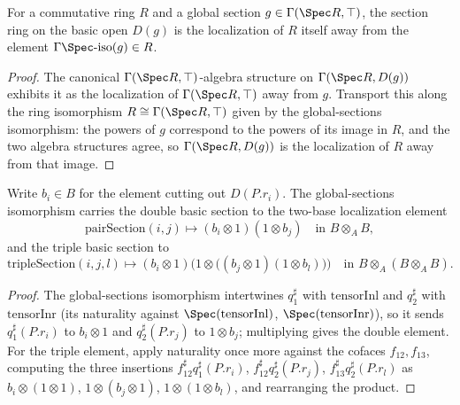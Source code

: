 \begin{theorem}
  \label{thm:isLocalization_away_sections}
  \leanok
  For a commutative ring \(R\) and a global section \(g \in \Gamma(\Spec R, \top)\), the
  section ring on the basic open \(D(g)\) is the localization of \(R\) itself away from the
  element \(\Gamma\Spec\text{-}\mathrm{iso}(g) \in R\).
\end{theorem}
\begin{proof}
  \leanok
  The canonical \(\Gamma(\Spec R, \top)\)-algebra structure on \(\Gamma(\Spec R, D(g))\)
  exhibits it as the localization of \(\Gamma(\Spec R, \top)\) away from \(g\). Transport this
  along the ring isomorphism \(R \cong \Gamma(\Spec R, \top)\) given by the global-sections
  isomorphism: the powers of \(g\) correspond to the powers of its image in \(R\), and the two
  algebra structures agree, so \(\Gamma(\Spec R, D(g))\) is the localization of \(R\) away from
  that image.
\end{proof}

\begin{lemma}
  \label{lem:GammaSpecIso_hom_pairTripleSection}
  \leanok
  Write \(b_i \in B\) for the element cutting out \(D(P.r_i)\). The global-sections
  isomorphism carries the double basic section to the two-base localization element
  \[
    \mathrm{pairSection}(i, j) \mapsto (b_i \otimes 1)(1 \otimes b_j)
    \quad\text{in } B \otimes_A B ,
  \]
  and the triple basic section to
  \[
    \mathrm{tripleSection}(i, j, l) \mapsto
      (b_i \otimes 1)\bigl(1 \otimes \bigl((b_j \otimes 1)(1 \otimes b_l)\bigr)\bigr)
    \quad\text{in } B \otimes_A (B \otimes_A B) .
  \]
\end{lemma}
\begin{proof}
  \leanok
  The global-sections isomorphism intertwines \(q_1^{\sharp}\) with \(\mathrm{tensorInl}\) and
  \(q_2^{\sharp}\) with \(\mathrm{tensorInr}\) (its naturality against
  \(\Spec(\mathrm{tensorInl})\), \(\Spec(\mathrm{tensorInr})\)), so it sends
  \(q_1^{\sharp}(P.r_i)\) to \(b_i \otimes 1\) and \(q_2^{\sharp}(P.r_j)\) to \(1 \otimes b_j\);
  multiplying gives the double element. For the triple element, apply naturality once more
  against the cofaces \(f_{12}, f_{13}\), computing the three insertions
  \(f_{12}^{\sharp} q_1^{\sharp}(P.r_i)\), \(f_{12}^{\sharp} q_2^{\sharp}(P.r_j)\),
  \(f_{13}^{\sharp} q_2^{\sharp}(P.r_l)\) as \(b_i \otimes (1 \otimes 1)\),
  \(1 \otimes (b_j \otimes 1)\), \(1 \otimes (1 \otimes b_l)\), and rearranging the product.
\end{proof}

